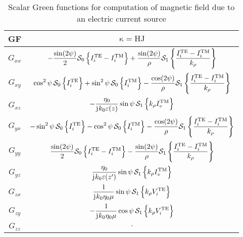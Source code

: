 \documentclass[12pt]{article}
\begin{document}
%
%
%
\begin{table}[!ht]
  \begin{center}
    \begin{tabular}{|| c | c ||}
      \hline
      GF & $\mathrm{\kappa} = \mathrm{HJ}$ \\ [0.5ex]
      \hline\hline
      $G_{xx}$ & $ \displaystyle - \frac{\sin (2 \psi)}{2} \mathcal{S}_0 \left \{ {I_i^\mathrm{TE} - I_i^\mathrm{TM}} \right \} + \frac{\sin (2 \psi)}{\rho} \mathcal{S}_1 \left \{ \frac{I_i^\mathrm{TE} - I_i^\mathrm{TM}}{k_{\rho}} \right \}$ \\ [2.5ex]
      $G_{xy}$ & $ \displaystyle  \cos^2 \psi \, \mathcal{S}_0 \left \{ I_i^\mathrm{TE} \right \} + \sin^2 \psi \, \mathcal{S}_0 \left \{ I_i^\mathrm{TM} \right \} - \frac{ \cos (2 \psi)}{\rho} \mathcal{S}_1 \left \{ \frac{I_i^\mathrm{TE} - I_i^\mathrm{TM}}{k_{\rho}} \right \}$ \\ [2.5ex]
      $G_{xz}$ & $\displaystyle -\frac{\eta_0}{\mathrm{j}\mkern1mu k_0 \varepsilon(z)} \sin \psi \,  \mathcal{S}_1 \left \{ {k_{\rho} I_v^\mathrm{TM}} \right \}$ \\ [2.5ex]
      $G_{yx}$ & $ \displaystyle  -\sin^2 \psi \, \mathcal{S}_0 \left \{ I_i^\mathrm{TE} \right \} - \cos^2 \psi \, \mathcal{S}_0 \left \{ I_i^\mathrm{TM} \right \} - \frac{ \cos (2 \psi)}{\rho} \mathcal{S}_1 \left \{ \frac{I_i^\mathrm{TE} - I_i^\mathrm{TM}}{k_{\rho}} \right \}$  \\ [2.5ex]
      $G_{yy}$ & $ \displaystyle  \frac{\sin (2 \psi)}{2} \mathcal{S}_0 \left \{ {I_i^\mathrm{TE} - I_i^\mathrm{TM}} \right \} - \frac{\sin (2 \psi)}{\rho} \mathcal{S}_1 \left \{ \frac{I_i^\mathrm{TE} - I_i^\mathrm{TM}}{k_{\rho}} \right \}$ \\ [2.5ex]
      $G_{yz}$ & $\displaystyle \frac{\eta_0}{\mathrm{j}\mkern1mu k_0 \varepsilon(z')} \sin \psi \,  \mathcal{S}_1 \left \{ {k_{\rho} I_v^\mathrm{TM}} \right \}$  \\ [2.5ex]
      $G_{zx}$ & $\displaystyle \frac{1}{\mathrm{j}\mkern1mu k_0 \eta_0 \mu} \sin \psi \,  \mathcal{S}_1 \left \{ {k_{\rho} V_i^\mathrm{TE}} \right \}$    \\ [2.5ex]
      $G_{zy}$ & $\displaystyle -\frac{1}{\mathrm{j}\mkern1mu k_0 \eta_0 \mu} \cos \psi \,  \mathcal{S}_1 \left \{ {k_{\rho} V_i^\mathrm{TE}} \right \}$   \\ [2.5ex]
      $G_{zz}$ & $\displaystyle \cdot $  \\ [2.5ex]
      \hline
    \end{tabular}
  \end{center}
  \caption{Scalar Green functions for computation of magnetic field due to an electric current source \cite{Michalski2005}}
  \label{tab:HJ}
\end{table}
\end{document}
